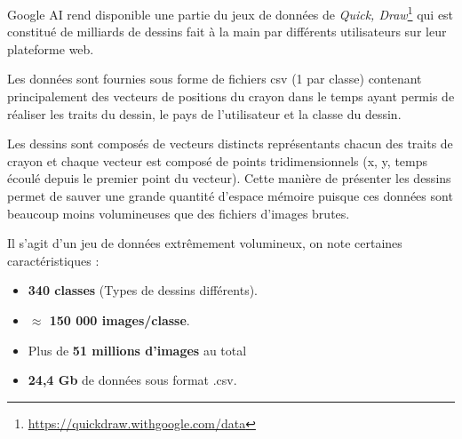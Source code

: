 Google AI rend disponible une partie du jeux de données de \emph{Quick, Draw}\footnote{\url{https://quickdraw.withgoogle.com/data}} qui est constitué de milliards de dessins fait à la main par différents utilisateurs sur leur plateforme web. 


Les données sont fournies sous forme de fichiers csv (1 par classe) contenant principalement des vecteurs de positions du crayon dans le temps ayant permis de réaliser les traits du dessin, le pays de l'utilisateur et la classe du dessin.

Les dessins sont composés de vecteurs distincts représentants chacun des traits de crayon et chaque vecteur est composé de points tridimensionnels (x, y, temps écoulé depuis le premier point du vecteur).
Cette manière de présenter les dessins permet de sauver une grande quantité d'espace mémoire puisque ces données sont beaucoup moins volumineuses que des fichiers d'images brutes.

Il s'agit d'un jeu de données extrêmement volumineux, on note certaines caractéristiques :

\begin{itemize}
	\item \textbf{340 classes} (Types de dessins différents).
	\item \textbf{$\approx$ 150 000 images/classe}.
	\item Plus de \textbf{51 millions d'images} au total
	\item \textbf{24,4 Gb} de données sous format .csv.
\end{itemize}
